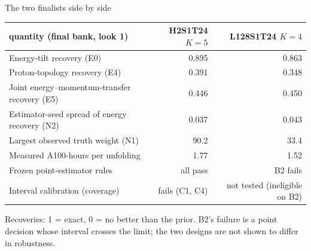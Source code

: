 \documentclass[aspectratio=169,10pt]{beamer}
\def\evidencetext{}
\begin{document}
\gdef\evidencetext{\texttt{results/final/decision\_look1.json}; \texttt{results/final/coverage\_dev/decision\_final.json}; \texttt{resources/cost\_fb\_look1-20260930.json}}
\begin{frame}{The two finalists side by side}
{\small
\begin{tabular}{lrr}
\toprule
quantity (final bank, look 1) & H2S1T24 $K{=}5$ & L128S1T24 $K{=}4$ \\
\midrule
Energy-tilt recovery (E0) & 0.895 & 0.863 \\
Proton-topology recovery (E4) & 0.391 & 0.348 \\
Joint energy--momentum-transfer recovery (E5) & 0.446 & 0.450 \\
Estimator-seed spread of energy recovery (N2) & 0.037 & 0.043 \\
Largest observed truth weight (N1) & 90.2 & 33.4 \\
Measured A100-hours per unfolding & 1.77 & 1.52 \\
Frozen point-estimator rules & all pass & B2 fails \\
Interval calibration (coverage) & fails (C1, C4) & not tested (ineligible on B2) \\
\bottomrule
\end{tabular}}\par\vspace{0.15cm}\scriptsize Recoveries: 1 = exact, 0 = no better than the prior. B2's failure is a point decision whose interval crosses the limit; the two designs are not shown to differ in robustness.
\end{frame}
\end{document}
